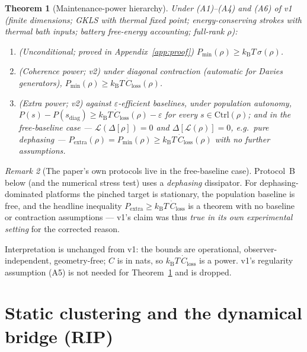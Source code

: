 \documentclass[11pt,a4paper]{article}
\theoremstyle{plain}
\newtheorem{theorem}{Theorem}[section]
\theoremstyle{definition}
\theoremstyle{remark}
\newtheorem{remark}[theorem]{Remark}
\newcommand{\kB}{k_{\mathrm{B}}}
\newcommand{\Ctrl}{\mathrm{Ctrl}}
\newcommand{\Pextra}{P_{\mathrm{extra}}}
\newcommand{\Pmin}{P_{\min}}
\newcommand{\Closs}{\dot{C}_{\mathrm{loss}}}
\begin{document}
\begin{theorem}[Maintenance-power hierarchy]\label{thm:hierarchy}
Under (A1)--(A4) and (A6) of v1 (finite dimensions; GKLS with thermal fixed
point; energy-conserving strokes with thermal bath inputs; battery
free-energy accounting; full-rank $\rho$):
\begin{enumerate}
\item[(a)] (\emph{Unconditional; proved in Appendix~\ref{app:proof}})
$\Pmin(\rho) \ge \kB T\,\sigma(\rho)$.
\item[(b)] (\emph{Coherence power; \cite{MaintWork} v2}) under diagonal
contraction (automatic for Davies generators), $\Pmin(\rho) \ge \kB
T\,\Closs(\rho)$.
\item[(c)] (\emph{Extra power; \cite{MaintWork} v2}) against
$\varepsilon$-efficient baselines, under population autonomy,
$P(s) - P(s_{\mathrm{diag}}) \ge \kB T\,\Closs(\rho) - \varepsilon$ for
every $s \in \Ctrl(\rho)$; and in the \emph{free-baseline} case ---
$\mathcal{L}(\Delta[\rho]) = 0$ and $\Delta[\mathcal{L}(\rho)] = 0$, e.g.\
pure dephasing --- $\Pextra(\rho) = \Pmin(\rho) \ge \kB T\,\Closs(\rho)$
with no further assumptions.
\end{enumerate}
\end{theorem}

\begin{remark}[The paper's own protocols live in the free-baseline case]
\label{rem:freebaseline}
Protocol~B below (and the numerical stress test) uses a \emph{dephasing}
dissipator. For dephasing-dominated platforms the pinched target is
stationary, the population baseline is free, and the headline inequality
$\Pextra \ge \kB T\,\Closs$ is a theorem with no baseline or contraction
assumptions --- v1's claim was thus \emph{true in its own experimental
setting} for the corrected reason.
\end{remark}

Interpretation is unchanged from v1: the bounds are operational,
observer-independent, geometry-free; $C$ is in nats, so $\kB T\,\Closs$ is a
power. v1's regularity assumption (A5) is not needed for
Theorem~\ref{thm:hierarchy} and is dropped.

\section{Static clustering and the dynamical bridge (RIP)}\label{sec:rip}
\end{document}
